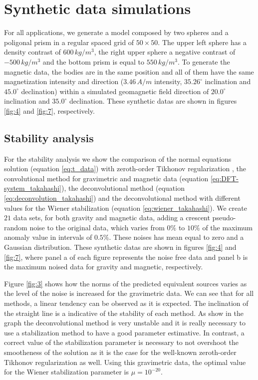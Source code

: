 \section{Synthetic data simulations}
\label{sec:synthetic_simulations}

For all applications, we generate a model composed by two spheres and a poligonal prism in a regular spaced grid of $50 \times 50$. The upper left sphere has a density contrast of $600 \, kg/m^3$, the right upper sphere a negative contrast of $-500 \, kg/m^3$ and the bottom prism is equal to $550 \, kg/m^3$. To generate the magnetic data, the bodies are in the same position and all of them have the same magnetization intensity and direction ($3.46 \, A/m$ intensity, $35.26^{\circ}$ inclination and $45.0^{\circ}$ declination) within a simulated geomagnetic field direction of $20.0^{\circ}$ inclination and $35.0^{\circ}$ declination. These synthetic datas are shown in figures \ref{fig:4} and \ref{fig:7}, respectively.

\subsection{Stability analysis}

For the stability analysis we show the comparison of the normal equations solution (equation \ref{eq:t_data}) with zeroth-order Tikhonov regularization \citep{aster2018parameter}, the convolutional method for gravimetric and magnetic data (equation \ref{eq:DFT-system_takahashi}), the deconvolutional method (equation \ref{eq:deconvolution_takahashi}) and the deconvolutional method with different values for the Wiener stabilization (equation \ref{eq:wiener_takahashi}). We create $21$ data sets, for both gravity and magnetic data, adding a crescent pseudo-random noise to the original data, which varies from $0\%$ to $10\%$ of the maximum anomaly value in intervals of $0.5\%$. These noises has mean equal to zero and a Gaussian distribution. These synthetic datas are shown in figures \ref{fig:4} and \ref{fig:7}, where panel a of each figure represents the noise free data and panel b is the maximum noised data for gravity and magnetic, respectively.
		
Figure \ref{fig:3} shows how the norms of the predicted equivalent sources varies as the level of the noise is increased for the gravimetric data. We can see that for all methods, a linear tendency can be observed as it is expected. The inclination of the straight line is a indicative of the stability of each method. As show in the graph the deconvolutional method is very unstable and it is really necessary to use a stabilization method to have a good parameter estimative. In contrast, a correct value of the stabilization parameter is necessary to not overshoot the smootheness of the solution as it is the case for the well-known zeroth-order Tikhonov regularization as well. Using this gravimetric data, the optimal value for the Wiener stabilization parameter is $\mu = 10^{-20}$. 

